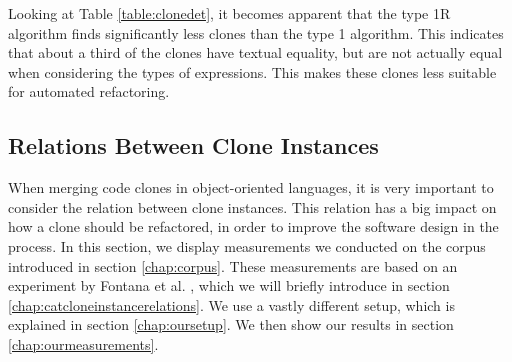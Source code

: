 \documentclass[a4paper]{article}
\begin{document}
Looking at Table \ref{table:clonedet}, it becomes apparent that the type 1R algorithm finds significantly less clones than the type 1 algorithm. This indicates that about a third of the clones have textual equality, but are not actually equal when considering the types of expressions. This makes these clones less suitable for automated refactoring.

\subsection{Relations Between Clone Instances} \label{chap:relationsinstances}
When merging code clones in object-oriented languages, it is very important to consider the relation between clone instances. This relation has a big impact on how a clone should be refactored, in order to improve the software design in the process. In this section, we display measurements we conducted on the corpus introduced in section \ref{chap:corpus}. These measurements are based on an experiment by Fontana et al. \cite{fontana2015duplicated}, which we will briefly introduce in section \ref{chap:catcloneinstancerelations}. We use a vastly different setup, which is explained in section \ref{chap:oursetup}. We then show our results in section \ref{chap:ourmeasurements}.
\end{document}
